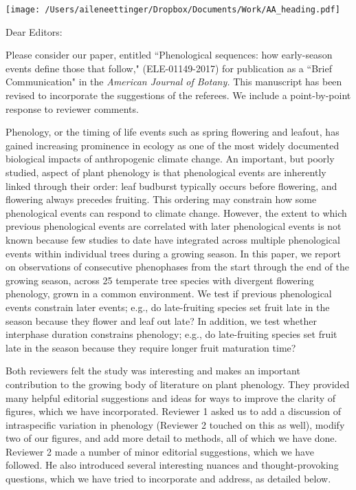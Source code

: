 \documentclass[10.95pt,a4paper]{letter}
\date{June 1, 2018}
\begin{document}
%

\begin{letter}{}
\texttt{[image: /Users/aileneettinger/Dropbox/Documents/Work/AA\_heading.pdf]}

\opening{Dear Editors:}
Please consider our paper, entitled ``Phenological sequences: how early-season events define those that follow,"  (ELE-01149-2017) for publication as a ``Brief Communication" in the \emph{American Journal of Botany.} This manuscript has been revised to incorporate the suggestions of the referees. We include a point-by-point response to reviewer comments.

Phenology, or the timing of life events such as spring flowering and leafout, has gained increasing prominence in ecology as one of the most widely documented biological impacts of anthropogenic climate change.  An important, but poorly studied, aspect of plant phenology is that phenological events are inherently linked through their order: leaf budburst typically occurs before flowering, and flowering always precedes fruiting. This ordering may constrain how some phenological events can respond to climate change. However, the extent to which previous phenological events are correlated with later phenological events is not known because few studies to date have integrated across multiple phenological events within individual trees during a growing season. In this paper, we report on observations of consecutive phenophases from the start through the end of the growing season, across 25 temperate tree species with divergent flowering phenology, grown in a common environment. We test if previous phenological events constrain later events; e.g., do late-fruiting species set fruit late in the season because they flower and leaf out late? In addition, we test whether interphase duration constrains phenology; e.g., do late-fruiting species set fruit late in the season because they require longer fruit maturation time? 

Both reviewers felt the study was interesting and makes an important contribution to the growing body of literature on plant phenology.  They provided many helpful editorial suggestions and ideas for ways to improve the clarity of figures, which we have incorporated. Reviewer 1 asked us to add a discussion of intraspecific variation in phenology (Reviewer 2 touched on this as well), modify two of our figures, and add more detail to methods, all of which we have done. Reviewer 2 made a number of minor editorial suggestions, which we have followed. He also introduced several interesting nuances and thought-provoking questions, which we have tried to incorporate and address, as detailed below. 


\end{letter}
\end{document}

